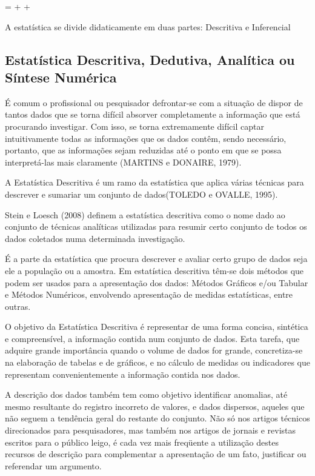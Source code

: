 \begin{center}
 =  +  + 
\end{center}

A estatística se divide didaticamente em duas partes: Descritiva e Inferencial


\subsection{Estatística Descritiva, Dedutiva, Analítica ou Síntese Numérica}

\inic É comum o profissional ou pesquisador defrontar-se com a situação de dispor de tantos dados que se torna difícil absorver completamente a informação que está procurando investigar. Com isso, se torna extremamente difícil captar intuitivamente todas as informações que os dados contêm, sendo necessário, portanto, que as informações sejam reduzidas até o ponto em que se possa interpretá-las mais claramente (MARTINS e DONAIRE, 1979).

\vskip0.3cm



A Estatística Descritiva é um ramo da estatística que aplica várias técnicas para descrever e sumariar um conjunto de dados(TOLEDO e OVALLE, 1995).\vskip0.3cm

Stein e Loesch (2008) definem a estatística descritiva como o nome dado ao conjunto de técnicas analíticas utilizadas para resumir certo conjunto de todos os dados coletados numa determinada investigação.\vskip0.3cm


É a parte da estatística que procura descrever e avaliar certo grupo de dados seja ele a população ou a amostra. Em estatística descritiva têm-se dois métodos que podem ser usados para a apresentação dos dados: Métodos Gráficos e/ou Tabular e Métodos Numéricos, envolvendo apresentação de medidas estatísticas, entre outras.\vskip0.3cm



O objetivo da Estatística Descritiva é representar de uma forma concisa, sintética e compreensível, a informação contida num conjunto de dados. Esta tarefa, que adquire grande importância quando o volume de dados for grande, concretiza-se na elaboração de tabelas e de gráficos, e no cálculo de medidas ou indicadores que representam convenientemente a informação contida nos dados.\vskip0.3cm


 A descrição dos dados também tem como objetivo identificar anomalias, até mesmo resultante do registro incorreto de valores, e dados dispersos, aqueles que não seguem a tendência geral do restante do conjunto. Não só nos artigos técnicos direcionados para pesquisadores, mas também nos artigos de jornais e revistas escritos para o público leigo, é cada vez mais freqüente a utilização destes recursos de descrição para complementar a apresentação de um fato, justificar ou referendar um
 argumento.\vskip0.3cm



